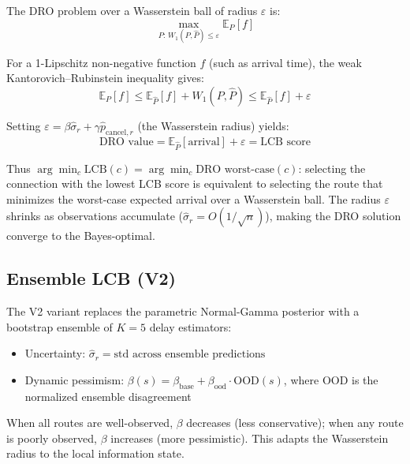 \documentclass[11pt]{article}
\theoremstyle{definition}
\theoremstyle{remark}
\begin{document}
The DRO problem over a Wasserstein ball of radius $\varepsilon$ is:
\begin{equation}
    \max_{P:\, W_1(P, \hat{P}) \leq \varepsilon} \mathbb{E}_P[f]
    \label{eq:dro}
\end{equation}

For a 1-Lipschitz non-negative function $f$ (such as arrival time), the weak Kantorovich--Rubinstein inequality gives:
\begin{equation}
    \mathbb{E}_P[f] \leq \mathbb{E}_{\hat{P}}[f] + W_1(P, \hat{P}) \leq \mathbb{E}_{\hat{P}}[f] + \varepsilon
    \label{eq:dro_bound}
\end{equation}

Setting $\varepsilon = \beta \hat{\sigma}_r + \gamma \hat{p}_{\mathrm{cancel},r}$ (the Wasserstein radius) yields:
\begin{equation}
    \text{DRO value} = \mathbb{E}_{\hat{P}}[\text{arrival}] + \varepsilon = \text{LCB score}
    \label{eq:lcb_dro}
\end{equation}

Thus $\arg\min_c \text{LCB}(c) = \arg\min_c \text{DRO worst-case}(c)$: selecting the connection with the lowest LCB score is equivalent to selecting the route that minimizes the worst-case expected arrival over a Wasserstein ball. The radius $\varepsilon$ shrinks as observations accumulate ($\hat{\sigma}_r = O(1/\sqrt{n})$), making the DRO solution converge to the Bayes-optimal.

\subsection{Ensemble LCB (V2)}
\label{sec:ensemble}

The V2 variant replaces the parametric Normal-Gamma posterior with a bootstrap ensemble of $K{=}5$ delay estimators:
\begin{itemize}
    \item Uncertainty: $\hat{\sigma}_r = \text{std across ensemble predictions}$
    \item Dynamic pessimism: $\beta(s) = \beta_{\mathrm{base}} + \beta_{\mathrm{ood}} \cdot \text{OOD}(s)$, where OOD is the normalized ensemble disagreement
\end{itemize}
When all routes are well-observed, $\beta$ decreases (less conservative); when any route is poorly observed, $\beta$ increases (more pessimistic). This adapts the Wasserstein radius to the local information state.
\end{document}
